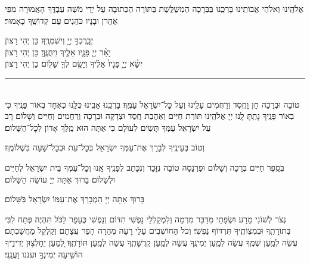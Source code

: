 \documentclass[twoside, openany, parskip=half, 11pt]{book}
\begin{document}
\retzeh

\yaalehveyavo

\zion

\modim

\alhanisim

\weekdaysahodos

אֱלֹהֵֽינוּ וֵאלֹהֵי אֲבוֹתֵֽינוּ בָּרְכֵֽנוּ בַּבְּרָכָה הַמְשֻׁלֶּֽשֶׁת בַּתּוֹרָה
הַכְּתוּבָה עַל יְדֵי מֹשֶׁה עַבְדֶּֽךָ הָאֲמוּרָה מִפִּי אַהֲרֹן וּבָנָיו כֹּהֲנִים עַם קְדוֹשֶֽׁךָ כָּאָמוּר׃

יְבָֽרֶכְךָ֥ יְיָ֖ וְיִשְׁמְרֶֽךָ׃ \hfill \kahal כֵּן יְהִי רָצוׂן \\
יָאֵ֨ר יְיָ֧ פָּנָ֛יו אֵלֶ֖יךָ וִֽיחֻנֶּֽךָּ׃ \hfill \kahal כֵּן יְהִי רָצוׂן \\
יִשָּׂ֨א יְיָ֤ פָּנָיו֙ אֵלֶ֔יךָ וְיָשֵׂ֥ם לְךָ֖ שָׁלֽוֹם׃ \hfill \kahal כֵּן יְהִי רָצוׂן

\rule[-0.5ex]{3in}{1pt}

\begin{paracol}{2}
\\
טוֹבָה וּבְרָכָה חֵן וָחֶֽסֶד וְרַחֲמִים עָלֵֽינוּ וְעַל כׇּל־יִשְׂרָאֵל עַמֶּֽךָ׃ בָּרְכֵֽנוּ אָבִֽינוּ כֻּלָּֽנוּ כְּאֶחָד בְּאוֹר פָּנֶֽיךָ כִּי בְאוֹר פָּנֶֽיךָ נָתַֽתָּ לָֽנוּ יְיָ אֱלֹהֵֽינוּ תּוֹרַת חַיִּים וְאַהֲבַת חֶֽסֶד וּצְדָקָה וּבְרָכָה וְרַחֲמִים וְחַיִּים וְשָׁלוֹם׃
\switchcolumn
{}
רָב עַל יִשְׂרָאֵל עַמְּךָ תָּשִׂים לְעוֹלָם כִּי אַתָּה הוּא מֶֽלֶךְ אָדוֹן לְכׇל־הַשָּׁלוֹם׃
\end{paracol}
וְטוֹב בְּעֵינֶֽיךָ לְבָרֵךְ אֶת־עַמְּךָ יִשְׂרָאֵל בְּכׇל־עֵת וּבְכׇל־שָׁעָה בִּשְׁלוֹמֶֽךָ׃


\begin{paracol}{2}
\begin{small}
בְּסֵֽפֶר חַיִּים בְּרָכָה וְשָׁלוֹם וּפַרְנָסָה טוֹבָה נִזָּכֵר וְנִכָּתֵב לְפָנֶֽיךָ אָֽנוּ וְכׇל־עַמְּךָ בֵּית יִשְׂרָאֵל לְחַיִּים וּלְשָׁלוֹם׃ בָּרוּךְ אַתָּה יְיָ עוֹשֵׂה הַשָּׁלוֹם׃

\end{small}
\switchcolumn
בָּרוּךְ אַתָּה יְיָ הַמְבָרֵךְ אֶת־עַמּוֹ יִשְׂרָאֵל בַּשָּׁלוֹם׃

\end{paracol}

נְצֹר לְשׁוֹנִי מֵרָע וּשְׂפָתַי מִדַּבֵּר מִרְמָה וְלִמְקַלְלַי נַפְשִׁי תִדּוֹם וְנַפְשִׁי כֶּעָפָר לַכֹּל תִּהְיֶה׃ פְּתַח לִבִּי בְּתוֹרָתֶֽךָ וּבְמִצְוֹתֶֽיךָ תִּרְדּוֹף נַפְשִׁי׃ וְכֹל הַחוֹשְׁבִים עָלַי רָעָה מְהֵרָה הָפֵר עֲצָתָם וְקַלְקֵל מַחֲשַׁבְתָם׃ עֲשֵׂה לְמַֽעַן שְׁמֶֽךָ עֲשֵׂה לְמַֽעַן יְמִינֶֽךָ עֲשֵׂה לְמַֽעַן קְדֻשָּׁתֶֽךָ עֲשֵׂה לְמַֽעַן תּוֹרָתֶֽךָ׃ לְ֭מַעַן יֵחָלְצ֣וּן יְדִידֶ֑יךָ
הוֹשִׁ֖יעָה יְמִינְךָ֣ ועננו וַעֲנֵֽנִי׃
\end{document}
